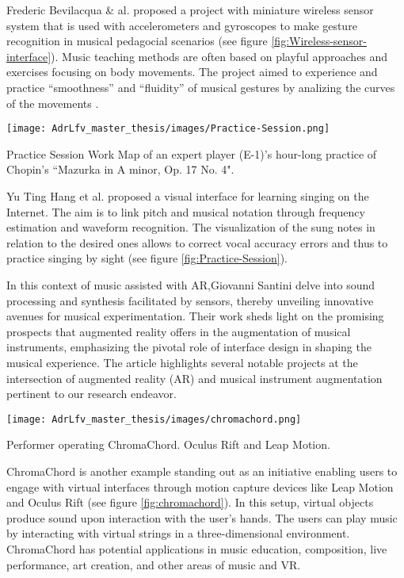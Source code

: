 Frederic Bevilacqua \& al. proposed a project with miniature wireless sensor system that is used with accelerometers and gyroscopes to make gesture recognition in musical pedagocial scenarios (see figure \ref{fig:Wireless-sensor-interface}). Music teaching methods are often based on playful approaches and exercises focusing on body movements. The project aimed to experience and practice “smoothness” and “fluidity” of musical gestures by analizing the curves of the movements \cite{bevilacqua2007wireless}.

\begin{marginfigure}
    \centering
    \texttt{[image: AdrLfv\_master\_thesis/images/Practice-Session.png]}
    \caption{Practice Session Work Map of an expert player (E-1)’s hour-long practice of Chopin’s “Mazurka in A minor, Op. 17 No. 4".}
    \label{fig:Practice-Session}
\end{marginfigure}

Yu Ting Hang et al. proposed a visual interface for learning singing on the Internet. The aim is to link pitch and musical notation through frequency estimation and waveform recognition. The visualization of the sung notes in relation to the desired ones allows to correct vocal accuracy errors and thus to practice singing by sight \cite{huang2016visualized} (see figure \ref{fig:Practice-Session}).

In this context of music assisted with AR,Giovanni Santini \cite{santini_giovanni_2020_4813449} delve into sound processing and synthesis facilitated by sensors, thereby unveiling innovative avenues for musical experimentation. Their work sheds light on the promising prospects that augmented reality offers in the augmentation of musical instruments, emphasizing the pivotal role of interface design in shaping the musical experience.
The article highlights several notable projects at the intersection of augmented reality (AR) and musical instrument augmentation pertinent to our research endeavor. 

\begin{marginfigure}
    \centering
    \texttt{[image: AdrLfv\_master\_thesis/images/chromachord.png]}
    \caption{Performer operating ChromaChord. Oculus Rift and Leap Motion.}
    \label{fig:chromachord}
\end{marginfigure}

ChromaChord \cite{fillwalk2015chromachord} is another example standing out as an initiative enabling users to engage with virtual interfaces through motion capture devices like Leap Motion and Oculus Rift (see figure \ref{fig:chromachord}). In this setup, virtual objects produce sound upon interaction with the user's hands. The users can play music by interacting with virtual strings in a three-dimensional environment. ChromaChord has potential applications in music education, composition, live performance, art creation, and other areas of music and VR.

